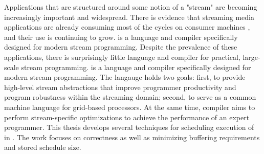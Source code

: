Applications that are structured around some notion of a "stream"
are becoming increasingly important and widespread.  There is
evidence that streaming media applications are already consuming
most of the cycles on consumer machines \cite{Rix98}, and their
use is continuing to grow.  {\StreamIt} is a language and compiler
specifically designed for modern stream programming.  Despite the
prevalence of these applications, there is surprisingly little
language and compiler for practical, large-scale stream
programming.  {\StreamIt} is a language and compiler specifically
designed for modern stream programming.  The {\StreamIt} langauge
holds two goals: first, to provide high-level stream abstractions
that improve programmer productivity and program robustness within
the streaming domain; second, to serve as a common machine
language for grid-based processors.  At the same time, {\StreamIt}
compiler aims to perform stream-specific optimizations to achieve
the performance of an expert programmer.  This thesis develops
several techniques for scheduling execution of {\filters} in
{\StreamIt}.  The work focuses on correctness as well as
minimizing buffering requirements and stored schedule size.
